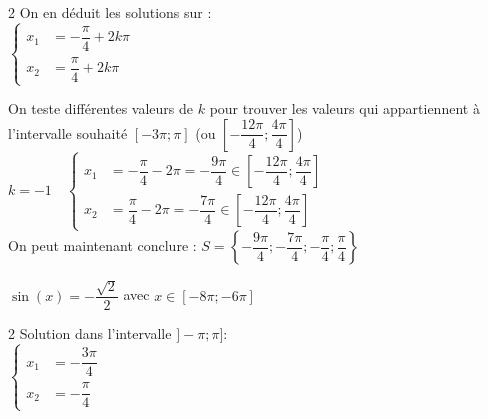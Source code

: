 \documentclass[11pt,a4paper]{article}  %
\begin{document}
\begin{enumMet}
\begin{corrBox}
\begin{multicols}{2}
			\columnbreak
			On en déduit les solutions sur \R:\\
			$\begin{cases}
				x_1 &=-\dfrac{\pi}{4}+2k\pi\\
				x_2 &=\dfrac{\pi}{4}+2k\pi\
			\end{cases}$\\
		\end{multicols}
		On teste différentes valeurs de $k$ pour trouver les valeurs qui appartiennent à l'intervalle souhaité $\left[-3\pi;\pi\right]$ (ou $\left[-\dfrac{12\pi}{4};\dfrac{4\pi}{4}\right]$)\\
		$k=-1\quad \begin{cases}
			x_1 &=-\dfrac{\pi}{4}-2\pi=-\dfrac{9\pi}{4}\in\left[-\dfrac{12\pi}{4};\dfrac{4\pi}{4}\right]\\
			x_2 &=\dfrac{\pi}{4}-2\pi=-\dfrac{7\pi}{4}\in\left[-\dfrac{12\pi}{4};\dfrac{4\pi}{4}\right]
		\end{cases}$\\
		On peut maintenant conclure : $S=\left\{-\dfrac{9\pi}{4};-\dfrac{7\pi}{4};-\dfrac{\pi}{4};\dfrac{\pi}{4}\right\}$
	\end{corrBox}
	\item {} $\sin(x)=-\dfrac{\sqrt{2}}{2}$ avec $x\in \left[-8\pi;-6\pi\right]$\\
	\begin{corrBox}
		\begin{multicols}{2}
			Solution dans l'intervalle $]-\pi;\pi]$:\\
			$\begin{cases}
				x_1 &=-\dfrac{3\pi}{4}\\
				x_2 &=-\dfrac{\pi}{4}
			\end{cases}$\\
			

\end{multicols}
\end{corrBox}
\end{enumMet}
\end{document}
